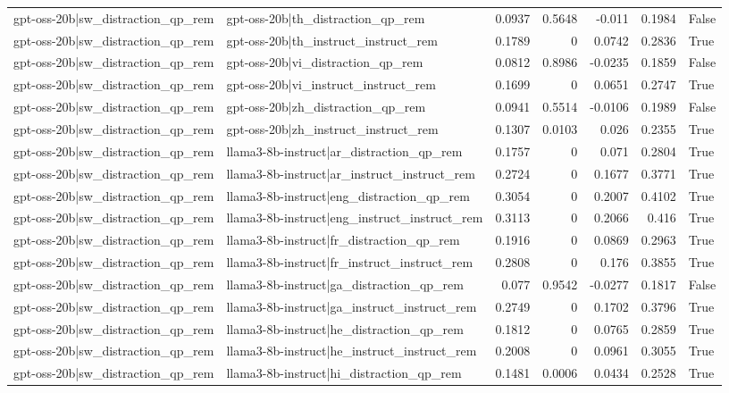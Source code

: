 \begin{table}
\begin{tabular}{l l r r r r l}
gpt-oss-20b|sw_distraction_qp_rem & gpt-oss-20b|th_distraction_qp_rem & 0.0937 & 0.5648 & -0.011 & 0.1984 & False \\
gpt-oss-20b|sw_distraction_qp_rem & gpt-oss-20b|th_instruct_instruct_rem & 0.1789 & 0 & 0.0742 & 0.2836 & True \\
gpt-oss-20b|sw_distraction_qp_rem & gpt-oss-20b|vi_distraction_qp_rem & 0.0812 & 0.8986 & -0.0235 & 0.1859 & False \\
gpt-oss-20b|sw_distraction_qp_rem & gpt-oss-20b|vi_instruct_instruct_rem & 0.1699 & 0 & 0.0651 & 0.2747 & True \\
gpt-oss-20b|sw_distraction_qp_rem & gpt-oss-20b|zh_distraction_qp_rem & 0.0941 & 0.5514 & -0.0106 & 0.1989 & False \\
gpt-oss-20b|sw_distraction_qp_rem & gpt-oss-20b|zh_instruct_instruct_rem & 0.1307 & 0.0103 & 0.026 & 0.2355 & True \\
gpt-oss-20b|sw_distraction_qp_rem & llama3-8b-instruct|ar_distraction_qp_rem & 0.1757 & 0 & 0.071 & 0.2804 & True \\
gpt-oss-20b|sw_distraction_qp_rem & llama3-8b-instruct|ar_instruct_instruct_rem & 0.2724 & 0 & 0.1677 & 0.3771 & True \\
gpt-oss-20b|sw_distraction_qp_rem & llama3-8b-instruct|eng_distraction_qp_rem & 0.3054 & 0 & 0.2007 & 0.4102 & True \\
gpt-oss-20b|sw_distraction_qp_rem & llama3-8b-instruct|eng_instruct_instruct_rem & 0.3113 & 0 & 0.2066 & 0.416 & True \\
gpt-oss-20b|sw_distraction_qp_rem & llama3-8b-instruct|fr_distraction_qp_rem & 0.1916 & 0 & 0.0869 & 0.2963 & True \\
gpt-oss-20b|sw_distraction_qp_rem & llama3-8b-instruct|fr_instruct_instruct_rem & 0.2808 & 0 & 0.176 & 0.3855 & True \\
gpt-oss-20b|sw_distraction_qp_rem & llama3-8b-instruct|ga_distraction_qp_rem & 0.077 & 0.9542 & -0.0277 & 0.1817 & False \\
gpt-oss-20b|sw_distraction_qp_rem & llama3-8b-instruct|ga_instruct_instruct_rem & 0.2749 & 0 & 0.1702 & 0.3796 & True \\
gpt-oss-20b|sw_distraction_qp_rem & llama3-8b-instruct|he_distraction_qp_rem & 0.1812 & 0 & 0.0765 & 0.2859 & True \\
gpt-oss-20b|sw_distraction_qp_rem & llama3-8b-instruct|he_instruct_instruct_rem & 0.2008 & 0 & 0.0961 & 0.3055 & True \\
gpt-oss-20b|sw_distraction_qp_rem & llama3-8b-instruct|hi_distraction_qp_rem & 0.1481 & 0.0006 & 0.0434 & 0.2528 & True \\

\end{tabular}
\end{table}
